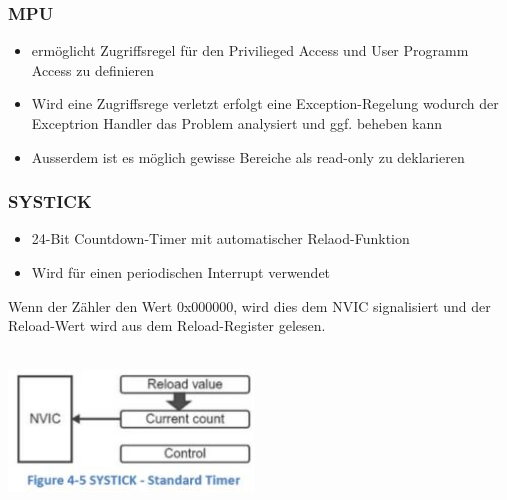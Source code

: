 \begin{multicols}{2}
\begin{minipage}{\linewidth}
        \subsubsection{MPU}
        \begin{itemize}
            \item ermöglicht Zugriffsregel für den Privilieged Access und User Programm Access zu definieren
            \item \rightarrow Wird eine Zugriffsrege verletzt erfolgt eine Exception-Regelung wodurch der Exceptrion Handler das Problem analysiert und ggf. beheben kann
            \item \rightarrow Ausserdem ist es möglich gewisse Bereiche als read-only zu deklarieren
        \end{itemize}
    \end{minipage}
\end{multicols}

\begin{multicols}{2}
    \begin{minipage}{\linewidth}
        \subsubsection{SYSTICK}
        \begin{itemize}
            \item 24-Bit Countdown-Timer mit automatischer Relaod-Funktion
            \item Wird für einen periodischen Interrupt verwendet
        \end{itemize}
        Wenn der Zähler den Wert 0x000000, wird dies dem NVIC signalisiert und  der Reload-Wert wird aus dem Reload-Register gelesen.
    \end{minipage}
    \\
    \newline
    \includegraphics[width=6.5cm]{images/NVIC}\\
\end{multicols}
\clearpage

